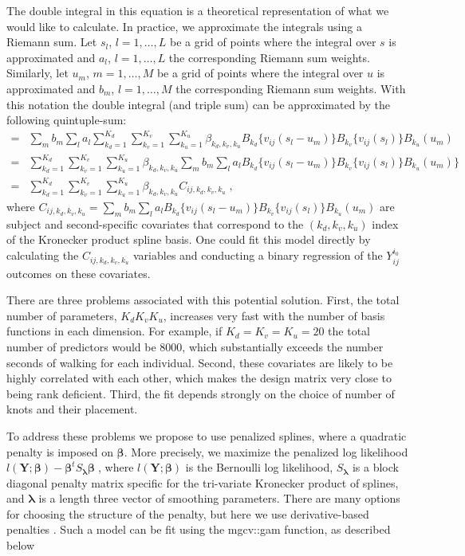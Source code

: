 The double integral in this equation is a theoretical representation of what we would like to calculate. In practice, we approximate the integrals using a Riemann sum. Let $s_l$, $l=1,\ldots,L$ be a grid of points where the integral over $s$ is approximated and $a_l$, $l=1,\ldots,L$ the corresponding Riemann sum weights. Similarly, let $u_m$, $m=1,\ldots,M$ be a grid of points where the integral over $u$ is approximated and $b_m$, $l=1,\ldots,M$ the corresponding Riemann sum weights. With this notation the double integral (and triple sum) can be approximated by the following quintuple-sum: 
\begin{align*}
     =&\sum_{m}b_{m}\sum_{l}a_{l}\sum_{k_d= 1}^{K_d}\sum_{k_v=1}^{K_v}\sum_{k_u=1}^{K_u}\beta_{k_d,k_v,k_u} B_{k_d}\{v_{ij}(s_l-u_m)\}B_{k_v}\{v_{ij}(s_{l})\}B_{k_u}(u_{m})\\
=& \sum_{k_d= 1}^{K_d}\sum_{k_v=1}^{K_v}\sum_{k_u=1}^{K_u} \beta_{k_d,k_v,k_u}\sum_{m}b_{m}\sum_{l}a_{l}B_{k_d}\{v_{ij}(s_{l}-u_{m})\}B_{k_v}\{v_{ij}(s_{l})\}B_{k_u}(u_{m})\}\\
=& \sum_{k_d= 1}^{K_d}\sum_{k_v=1}^{K_v}\sum_{k_u=1}^{K_u} \beta_{k_d,k_v,k_u} C_{ij,k_d,k_v,k_u}\;,
\end{align*}
where $C_{ij,k_d,k_v,k_u}=\sum_{m}b_{m}\sum_{l}a_{l} B_{k_d}\{v_{ij}(s_{l}-u_{m})\}B_{k_v}\{v_{ij}(s_{l})\}B_{k_u}(u_{m})$ are subject and second-specific covariates that correspond to  the $(k_d,k_v,k_u)$ index of the Kronecker product spline basis. One could fit this model directly by calculating the $C_{ij,k_d,k_v,k_u}$ variables and conducting a binary regression of the $Y_{ij}^{i_0}$ outcomes on these covariates.  


There are three problems associated with this potential solution. First, the total number of parameters, $K_dK_vK_u$, increases very fast with the number of basis functions in each dimension. For example, if $K_d=K_v=K_u=20$ the total number of predictors would be $8000$, which substantially exceeds the number seconds of walking for each individual. Second, these covariates are likely to be highly correlated with each other, which makes the design matrix very close to being rank deficient. Third, the fit depends strongly on the choice of number of knots and their placement. 

To address these problems we propose to use penalized splines, where a quadratic penalty is imposed on $\boldsymbol{\beta}$. More precisely, we maximize the penalized log likelihood $
 l(\boldsymbol{Y}; \boldsymbol{\beta})-\boldsymbol{\beta}^t\mathit{S}_{\boldsymbol{\lambda}}\boldsymbol{\beta} \;$,
where $l(\boldsymbol{Y}; \boldsymbol{\beta})$ is the Bernoulli log likelihood, $\mathit{S}_{\boldsymbol{\lambda}}$ is a block diagonal penalty matrix specific for the tri-variate Kronecker product of splines, and $\boldsymbol{\lambda}$ is a length three vector of smoothing parameters. There are many options for choosing the structure of the penalty, but here we use derivative-based penalties \cite{wood_p-splines_2017}. Such a model can be fit using the {\ttfamily mgcv::gam} function, as described below 

